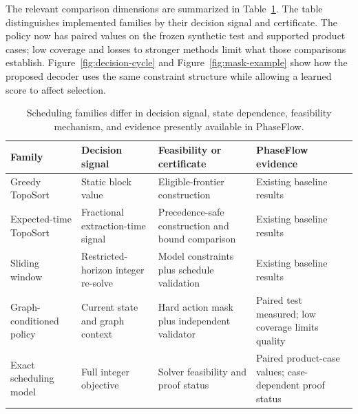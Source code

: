 \documentclass[11pt]{article}
\begin{document}
The relevant comparison dimensions are summarized in Table~\ref{tab:related-methods}. The table distinguishes implemented families by their decision signal and certificate. The policy now has paired values on the frozen synthetic test and supported product cases; low coverage and losses to stronger methods limit what those comparisons establish. Figure~\ref{fig:decision-cycle} and Figure~\ref{fig:mask-example} show how the proposed decoder uses the same constraint structure while allowing a learned score to affect selection.
\begin{table}[ht]
\centering\small
\caption{Scheduling families differ in decision signal, state dependence, feasibility mechanism, and evidence presently available in PhaseFlow.}\label{tab:related-methods}
\begin{tabular}{>{\raggedright\arraybackslash}p{}>{\raggedright\arraybackslash}p{}>{\raggedright\arraybackslash}p{}>{\raggedright\arraybackslash}p{}}
\toprule Family & Decision signal & Feasibility or certificate & PhaseFlow evidence \\
\midrule
Greedy TopoSort & Static block value & Eligible-frontier construction & Existing baseline results \\
Expected-time TopoSort & Fractional extraction-time signal & Precedence-safe construction and bound comparison & Existing baseline results \\
Sliding window & Restricted-horizon integer re-solve & Model constraints plus schedule validation & Existing baseline results \\
Graph-conditioned policy & Current state and graph context & Hard action mask plus independent validator & Paired test measured; low coverage limits quality \\
Exact scheduling model & Full integer objective & Solver feasibility and proof status & Paired product-case values; case-dependent proof status \\
\bottomrule
\end{tabular}
\end{table}
\end{document}
